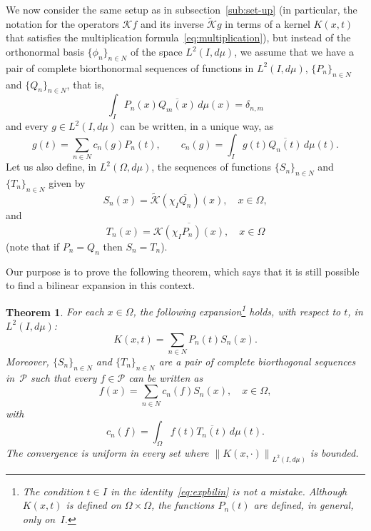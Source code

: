 \documentclass[11pt,a4paper]{amsart}
\theoremstyle{plain}
\newtheorem{Thm}{Theorem}
\theoremstyle{definition}
\newcommand{\calK}{\mathcal{K}}
\newcommand{\calP}{\mathcal{P}}
\begin{document}
We now consider the same setup as in subsection~\ref{sub:set-up}
(in particular, the notation for the operators $\calK f$
and its inverse $\widetilde{\calK}g$ in terms of a kernel $K(x,t)$
that satisfies the multiplication formula~\eqref{eq:multiplication}),
but instead of the orthonormal
basis $\{\phi_{n}\}_{n\in N}$ of the space $L^{2}(I,d\mu)$,
we assume that we have a pair of complete biorthonormal
sequences of functions in $L^{2}(I,d\mu)$, $\{P_{n}\}_{n\in N}$
and $\{Q_{n}\}_{n\in N}$, that is,
\begin{equation*}
  \int_{I}P_{n}(x)\overline{Q_{m}(x)}\,d\mu(x) = \delta_{n,m}
\end{equation*}
and every $g \in L^2(I,d\mu)$ can be written, in a unique way, as
\begin{equation*}
  g(t) = \sum_{n \in N} c_n(g) P_n(t),
  \qquad
  c_n(g) = \int_I g(t) \overline{Q_n(t)}\,d\mu(t).
\end{equation*}
Let us also define, in $L^2(\Omega,d\mu)$, the sequences of functions $\{S_n\}_{n\in N}$
and $\{T_n\}_{n\in N}$ given by
\begin{equation}
\label{eq:K-Qn}
  S_{n}(x) = \widetilde{\calK}(\chi_{I}\overline{Q_{n}})(x), \quad x \in \Omega,
\end{equation}
and
\begin{equation*}
  T_{n}(x) = \overline{\calK(\chi_{I}P_{n})(x)}, \quad x \in \Omega
\end{equation*}
(note that if $P_n = Q_n$ then $S_n = T_n$).

Our purpose is to prove the following theorem, which says that it is still
possible to find a bilinear expansion in this context.

\begin{Thm}
\label{thm:expbilin} 
For each $x\in \Omega$, the following expansion\footnote{The 
condition $t \in I$ in the identity~\eqref{eq:expbilin} is \textit{not} a mistake. 
Although $K(x,t)$ is defined on $\Omega \times \Omega$, the functions
$P_n(t)$ are defined, in general, only on~$I$.} holds, with respect to $t$,
in $L^2(I,d\mu)$:
\begin{equation}
\label{eq:expbilin}
  K(x,t) = \sum_{n\in N} P_{n}(t)S_{n}(x).
\end{equation}
Moreover, $\{S_n\}_{n\in N}$ and $\{T_n\}_{n\in N}$ are a pair of complete
biorthogonal sequences in~$\calP$ such that every
$f \in \calP$ can be written as
\begin{equation}
\label{eq:expbilinsamp}
  f(x) = \sum_{n \in N} c_n(f) S_n(x),
  \quad x \in \Omega,
\end{equation}
with
\begin{equation*}
  c_n(f) = \int_{\Omega} f(t) \overline{T_n(t)}\,d\mu(t).
\end{equation*}
The convergence is uniform in every set where $\left\|K(x,\cdot)\right\|_{L^{2}(I,d\mu)}$ is bounded.
\end{Thm}
\end{document}
